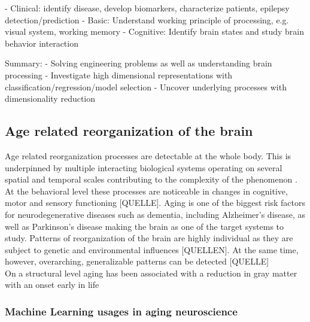 - Clinical: identify disease, develop biomarkers, characterize patients, epilepsy detection/prediction
- Basic: Understand working principle of processing, e.g. visual system, working memory
- Cognitive: Identify brain states and study brain behavior interaction

Summary: 
- Solving engineering problems as well as understanding brain processing 
- Investigate high dimensional representations with classification/regression/model selection 
- Uncover underlying processes with dimensionality reduction


\subsection{Age related reorganization of the brain}
Age related reorganization processes are detectable at the whole body. This is underpinned by multiple interacting biological systems operating on several spatial and temporal scales contributing to the complexity of the phenomenon \cite{Mooney2016}. At the behavioral level these processes are noticeable in changes in cognitive, motor and sensory functioning [QUELLE]. Aging is one of the biggest risk factors for neurodegenerative diseases such as dementia, including Alzheimer's disease, as well as Parkinson's disease making the brain as one of the target systems to study. Patterns of reorganization of the brain are highly individual as they are subject to genetic and environmental influences [QUELLEN]. At the same time, however, overarching, generalizable patterns can be detected [QUELLE]\\
On a structural level aging has been associated with a reduction in gray matter with an onset early in life 

\subsubsection{Machine Learning usages in aging neuroscience}

